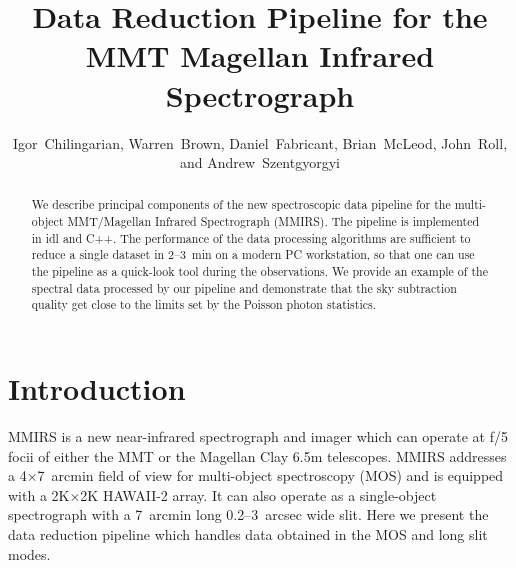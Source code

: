 
\resetcounters




\title{Data Reduction Pipeline for the MMT Magellan Infrared Spectrograph
}
\author{Igor~Chilingarian, 
Warren~Brown, Daniel~Fabricant, 
Brian~McLeod, John~Roll,
and Andrew~Szentgyorgyi
}


\begin{abstract} We describe principal components of the new spectroscopic data pipeline for the multi-object MMT/Magellan Infrared Spectrograph (MMIRS).  The pipeline is implemented in {\sc {}idl} and {\sc {}C++}.  The performance of the data processing algorithms are sufficient to reduce a single dataset in 2--3~min on a modern PC workstation, so that one can use the pipeline as a quick-look tool during the observations.  We provide an example of the spectral data processed by our pipeline and demonstrate that the sky subtraction quality get close to the limits set by the Poisson photon statistics.
\end{abstract}

\section{Introduction} 

MMIRS \citep{McLeod+12} is a new near-infrared spectrograph and imager which can operate at f/5 focii of either the MMT or the Magellan Clay 6.5m telescopes.  MMIRS addresses a 4$\times$7~arcmin field of view for multi-object spectroscopy (MOS) and is equipped with a 2K$\times$2K HAWAII-2 array.  It can also operate as a single-object spectrograph with a 7~arcmin long 0.2--3~arcsec wide slit.  Here we present the data reduction pipeline which handles data obtained in the MOS and long slit modes.

